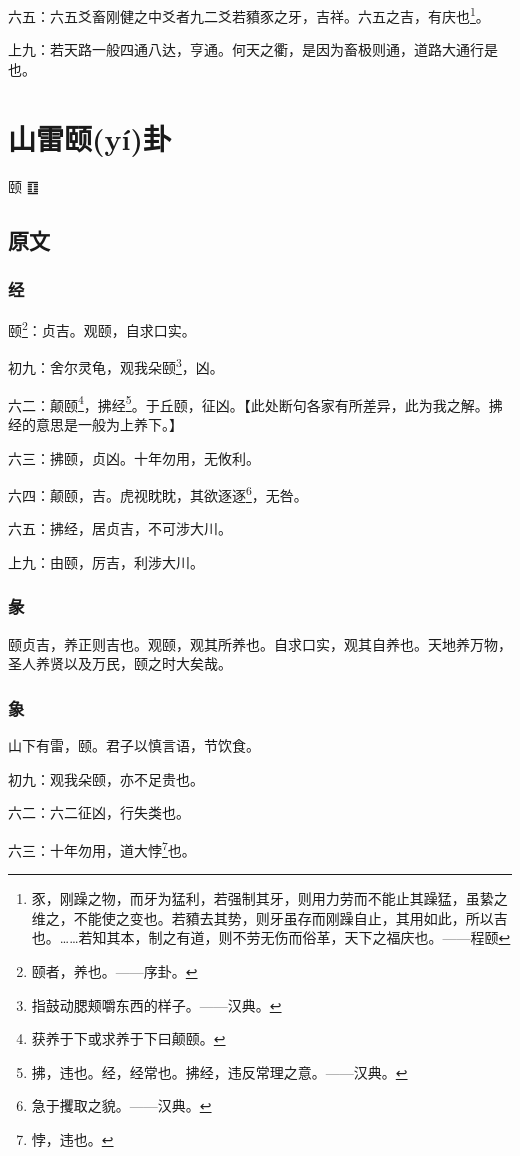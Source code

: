 \documentclass[12pt,oneside]{book}
\begin{document}
六五：六五爻畜刚健之中爻者九二爻若豶豕之牙，吉祥。六五之吉，有庆也\footnote{豕，刚躁之物，而牙为猛利，若强制其牙，则用力劳而不能止其躁猛，虽絷之维之，不能使之变也。若豶去其势，则牙虽存而刚躁自止，其用如此，所以吉也。……若知其本，制之有道，则不劳无伤而俗革，天下之福庆也。——程颐}。

上九：若天路一般四通八达，亨通。何天之衢，是因为畜极则通，道路大通行是也。


\chapter{山雷颐(yí)卦}
颐 {\Large ䷚}

\section{原文}

\subsection{经}
颐\footnote{颐者，养也。——序卦。}：贞吉。观颐，自求口实。

初九：舍尔灵龟，观我朵颐\footnote{指鼓动腮颊嚼东西的样子。——汉典。}，凶。

六二：颠颐\footnote{获养于下或求养于下曰颠颐。}，拂经\footnote{拂，违也。经，经常也。拂经，违反常理之意。——汉典。}。于丘颐，征凶。【此处断句各家有所差异，此为我之解。拂经的意思是一般为上养下。】

六三：拂颐，贞凶。十年勿用，无攸利。

六四：颠颐，吉。虎视眈眈，其欲逐逐\footnote{急于攫取之貌。——汉典。}，无咎。

六五：拂经，居贞吉，不可涉大川。

上九：由颐，厉吉，利涉大川。

\subsection{彖}
颐贞吉，养正则吉也。观颐，观其所养也。自求口实，观其自养也。天地养万物，圣人养贤以及万民，颐之时大矣哉。

\subsection{象}
山下有雷，颐。君子以慎言语，节饮食。

初九：观我朵颐，亦不足贵也。

六二：六二征凶，行失类也。

六三：十年勿用，道大悖\footnote{悖，违也。}也。
\end{document}
